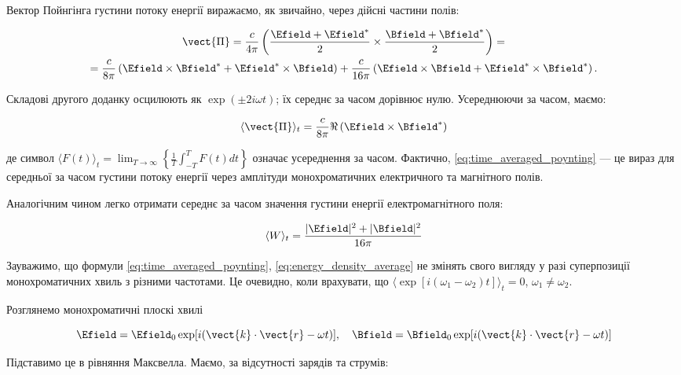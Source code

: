 Вектор Пойнгінга густини потоку енергії виражаємо, як звичайно, через дійсні частини полів:

\begin{multline*}
\vect{\Pi} = \frac{c}{4\pi} \left( \frac{\Efield + \Efield^{*}}{2} \times \frac{\Bfield + \Bfield^{*}}{2} \right) = \\
= \frac{c}{8\pi} \left( \Efield \times \Bfield^{*} + \Efield^{*} \times \Bfield \right) + \frac{c}{16\pi} \left( \Efield \times \Bfield +
\Efield^{*} \times \Bfield^{*} \right).
\end{multline*}

Складові другого доданку осцилюють як \(\exp(\pm 2i\omega t)\); їх середнє за часом дорівнює нулю. Усереднюючи за часом, маємо:

\begin{equation}
\langle \vect{\Pi} \rangle_t = \frac{c}{8\pi} \Re\left(\Efield \times \Bfield^{*}\right)
\label{eq:time_averaged_poynting}
\end{equation}

де символ \(\langle F(t) \rangle_t = \lim_{T \to \infty} \left\{ \frac{1}{T} \int_{-T}^{T} F(t) dt \right\}\) означає усереднення за часом. Фактично,
\eqref{eq:time_averaged_poynting} --- це вираз для середньої за часом густини потоку енергії через амплітуди монохроматичних електричного та магнітного
полів.

Аналогічним чином легко отримати середнє за часом значення густини енергії електромагнітного поля:

\begin{equation}
\langle W \rangle_t = \frac{\lvert \Efield \rvert^2 + \lvert \Bfield \rvert^2}{16\pi}
\label{eq:energy_density_average}
\end{equation}

Зауважимо, що формули \eqref{eq:time_averaged_poynting}, \eqref{eq:energy_density_average} не змінять свого вигляду у разі суперпозиції монохроматичних
хвиль з різними частотами. Це очевидно, коли врахувати, що \(\langle \exp[i(\omega_1 - \omega_2)t] \rangle_t = 0\), \(\omega_1 \neq \omega_2\).

Розглянемо монохроматичні плоскі хвилі

\begin{equation*}
\Efield = \Efield_0 \exp[i(\vect{k} \cdot \vect{r} - \omega t)], \quad \Bfield = \Bfield_0 \exp[i(\vect{k} \cdot \vect{r} - \omega t)]
\label{eq:monochromatic_waves}
\end{equation*}

Підставимо це в рівняння Максвелла. Маємо, за відсутності зарядів та струмів:

